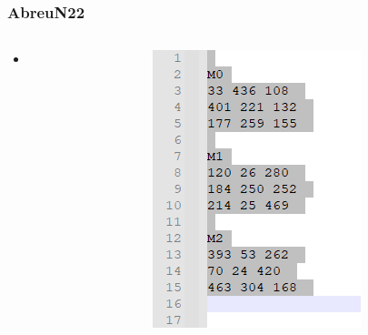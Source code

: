 \documentclass[dvipsnames,aspectratio=169]{beamer}
\begin{document}
\begin{frame}
\frametitle{AbreuN22 \cite{AbreuN22}}
\begin{columns}
\begin{column}{0.5\textwidth}
\begin{itemize}
\item
\end{itemize}
\end{column}
\begin{column}{0.5\textwidth}
\includegraphics[width=.5\textwidth]{images/AbreuN22}
\end{column}
\end{columns}
\end{frame}
\end{document}
